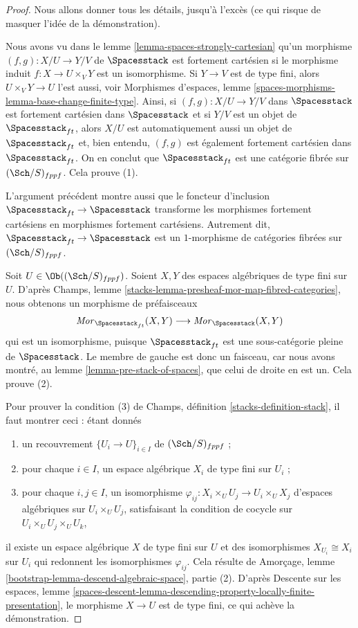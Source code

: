 \begin{proof}
Nous allons donner tous les détails, jusqu'à l'excès (ce qui risque
de masquer l'idée de la démonstration).

\medskip\noindent
Nous avons vu dans le
lemme \ref{lemma-spaces-strongly-cartesian}
qu'un morphisme $(f, g) : X/U \to Y/V$ de $\Spacesstack$ est
fortement cartésien si le morphisme induit $f : X \to U \times_V Y$
est un isomorphisme. Si $Y \to V$ est de type fini,
alors $U \times_V Y \to U$ l'est aussi, voir
Morphismes d'espaces,
lemme \ref{spaces-morphisms-lemma-base-change-finite-type}.
Ainsi, si $(f, g) : X/U \to Y/V$ dans $\Spacesstack$ est
fortement cartésien dans $\Spacesstack$ et si $Y/V$ est un objet
de $\Spacesstack_{ft}$, alors $X/U$ est automatiquement aussi un
objet de $\Spacesstack_{ft}$ et, bien entendu, $(f, g)$ est
également fortement cartésien dans $\Spacesstack_{ft}$. On en
conclut que $\Spacesstack_{ft}$ est une catégorie fibrée sur
$(\Sch/S)_{fppf}$. Cela prouve (1).

\medskip\noindent
L'argument précédent montre aussi que le foncteur d'inclusion
$\Spacesstack_{ft} \to \Spacesstack$ transforme les
morphismes fortement cartésiens en morphismes fortement cartésiens.
Autrement dit, $\Spacesstack_{ft} \to \Spacesstack$ est
un $1$-morphisme de catégories fibrées sur $(\Sch/S)_{fppf}$.

\medskip\noindent
Soit $U \in \Ob((\Sch/S)_{fppf})$.
Soient $X, Y$ des espaces algébriques de type fini sur $U$. D'après
Champs, lemme \ref{stacks-lemma-presheaf-mor-map-fibred-categories},
nous obtenons un morphisme de préfaisceaux
$$
\mathit{Mor}_{\Spacesstack_{ft}}(X, Y)
\longrightarrow
\mathit{Mor}_{\Spacesstack}(X, Y)
$$
qui est un isomorphisme, puisque $\Spacesstack_{ft}$ est une sous-catégorie pleine de
$\Spacesstack$. Le membre de gauche est donc un faisceau, car nous avons montré,
au lemme \ref{lemma-pre-stack-of-spaces},
que celui de droite en est un. Cela prouve (2).

\medskip\noindent
Pour prouver la condition (3) de
Champs, définition \ref{stacks-definition-stack},
il faut montrer ceci : étant donnés
\begin{enumerate}
\item un recouvrement $\{U_i \to U\}_{i \in I}$ de $(\Sch/S)_{fppf}$ ;
\item pour chaque $i \in I$, un espace algébrique $X_i$ de type fini sur $U_i$ ;
\item pour chaque $i, j \in I$, un isomorphisme
$\varphi_{ij} : X_i \times_U U_j \to U_i \times_U X_j$ d'espaces algébriques
sur $U_i \times_U U_j$, satisfaisant la condition de cocycle sur
$U_i \times_U U_j \times_U U_k$,
\end{enumerate}
il existe un espace algébrique $X$ de type fini sur $U$ et des isomorphismes
$X_{U_i} \cong X_i$ sur $U_i$ qui redonnent les isomorphismes $\varphi_{ij}$.
Cela résulte de
Amorçage, lemme \ref{bootstrap-lemma-descend-algebraic-space}, partie (2). D'après
Descente sur les espaces, lemme
\ref{spaces-descent-lemma-descending-property-locally-finite-presentation},
le morphisme $X \to U$ est de type fini, ce qui achève la démonstration.
\end{proof}

